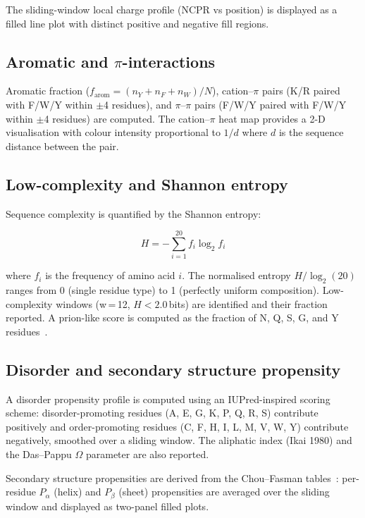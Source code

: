 \documentclass[12pt]{article}
\begin{document}
The sliding-window local charge profile (NCPR vs position) is displayed as
a filled line plot with distinct positive and negative fill regions.

\subsection{Aromatic and $\pi$-interactions}

Aromatic fraction ($f_{\text{arom}} = (n_Y + n_F + n_W) / N$), cation--$\pi$
pairs (K/R paired with F/W/Y within $\pm$4 residues), and $\pi$--$\pi$ pairs
(F/W/Y paired with F/W/Y within $\pm$4 residues) are computed.
The cation--$\pi$ heat map provides a 2-D visualisation with colour intensity
proportional to $1/d$ where $d$ is the sequence distance between the pair.

\subsection{Low-complexity and Shannon entropy}

Sequence complexity is quantified by the Shannon entropy:

\begin{equation}
H = -\sum_{i=1}^{20} f_i \log_2 f_i
\end{equation}

where $f_i$ is the frequency of amino acid $i$.
The normalised entropy $H/\log_2(20)$ ranges from 0 (single residue type)
to 1 (perfectly uniform composition).
Low-complexity windows (w\,=\,12, $H < 2.0$\,bits) are identified and
their fraction reported.
A prion-like score is computed as the fraction of N, Q, S, G, and Y
residues~\citep{lancaster2014}.

\subsection{Disorder and secondary structure propensity}

A disorder propensity profile is computed using an IUPred-inspired scoring
scheme: disorder-promoting residues (A, E, G, K, P, Q, R, S) contribute
positively and order-promoting residues (C, F, H, I, L, M, V, W, Y)
contribute negatively, smoothed over a sliding window.
The aliphatic index (Ikai 1980) and the Das--Pappu $\Omega$ parameter are
also reported.

Secondary structure propensities are derived from the Chou--Fasman
tables~\citep{chou1974}: per-residue $P_\alpha$ (helix) and $P_\beta$ (sheet)
propensities are averaged over the sliding window and displayed as two-panel
filled plots.
\end{document}
